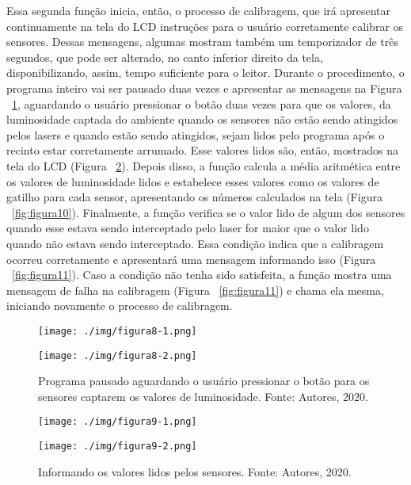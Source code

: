 \documentclass[10pt,twocolumn,letterpaper]{article}
\begin{document}
Essa segunda função inicia, então, o processo de calibragem, que irá apresentar continuamente na tela do LCD instruções para o usuário corretamente calibrar os sensores. Dessas mensagens, algumas mostram também um temporizador de três segundos, que pode ser alterado, no canto inferior direito da tela, disponibilizando, assim, tempo suficiente para o leitor. Durante o procedimento, o programa inteiro vai ser pausado duas vezes e apresentar as mensagens na Figura ~\ref{fig:figura8}, aguardando o usuário pressionar o botão duas vezes para que os valores, da luminosidade captada do ambiente quando os sensores não estão sendo atingidos pelos lasers e quando estão sendo atingidos, sejam lidos pelo programa após o recinto estar corretamente arrumado. Esse valores lidos são, então, mostrados na tela do LCD (Figura ~\ref{fig:figura9}). Depois disso, a função calcula a média aritmética entre os valores de luminosidade lidos e estabelece esses valores como os valores de gatilho para cada sensor, apresentando os números calculados na tela (Figura ~\ref{fig:figura10}). Finalmente, a função verifica se o valor lido de algum dos sensores quando esse estava sendo interceptado pelo laser for maior que o valor lido quando não estava sendo interceptado. Essa condição indica que a calibragem ocorreu corretamente e apresentará uma mensagem informando isso (Figura ~\ref{fig:figura11}). Caso a condição não tenha sido satisfeita, a função mostra uma mensagem de falha na calibragem (Figura ~\ref{fig:figura11}) e chama ela mesma, iniciando novamente o processo de calibragem.

{
\begin{figure}[h]
    \begin{minipage}[!]{0.49\linewidth}
    \texttt{[image: ./img/figura8-1.png]}
    \end{minipage}
    \begin{minipage}[!]{0.49\linewidth}
    \texttt{[image: ./img/figura8-2.png]}
    \end{minipage}
    \caption{ Programa pausado aguardando o usuário pressionar o botão para os sensores captarem os valores de luminosidade. Fonte: Autores, 2020.}
\label{fig:figura8}
\end{figure}
}

{
\begin{figure}[h]
    \begin{minipage}[!]{0.49\linewidth}
    \texttt{[image: ./img/figura9-1.png]}
    \end{minipage}
    \begin{minipage}[!]{0.49\linewidth}
    \texttt{[image: ./img/figura9-2.png]}
    \end{minipage}
    \caption{  Informando os valores lidos pelos sensores. Fonte: Autores, 2020.}
\label{fig:figura9}
\end{figure}
}
\end{document}

